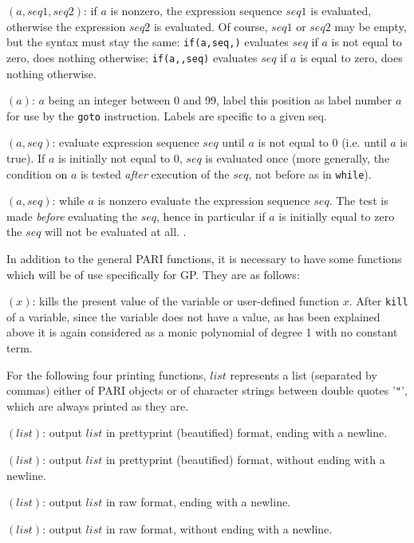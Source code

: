 $(a,seq1,seq2)$: if $a$ is nonzero, the expression sequence $seq1$
is evaluated, otherwise the expression $seq2$ is evaluated. Of course, $seq1$ or $seq2$
may be empty, but the syntax must stay the same: {\tt if(a,seq,)} evaluates $seq$ if
$a$ is not equal to zero, does nothing otherwise; {\tt if(a,,seq)} evaluates $seq$ if $a$
is equal to zero, does nothing otherwise.

$(a)$: $a$ being an integer between 0 and 99, label this
position as label number $a$ for use by the {\tt goto} instruction. Labels
are specific to a given seq.

$(a,seq)$: evaluate expression sequence $seq$ until $a$ is not
equal to 0 (i.e. until $a$ is true). If $a$ is initially not equal to 0, $seq$ is
evaluated once (more generally, the condition on $a$ is tested {\sl after} execution of
the $seq$, not before as in {\tt while}).

$(a,seq)$: while $a$ is nonzero evaluate the expression sequence
$seq$. The test is made {\sl before} evaluating the $seq$, hence in particular if $a$
is initially equal to zero the $seq$ will not be evaluated at all.
\smallskip
{}.

In addition to the general PARI functions, it is necessary to have some functions
which will be of use specifically for GP. They are as follows:

$(x)$: kills the present value of the variable or user-defined
function $x$. After {\tt kill} of a variable, since the variable does not have a value,
as has been explained above it is again considered as a monic polynomial of degree 1
with no constant term.

For the following four printing functions, $list$ represents a list (separated by
commas) either of PARI objects or of character strings between double quotes
'{\tt "}', which are always printed as they are.

$(list)$: output $list$ in prettyprint (beautified) format,
ending with a newline.

$(list)$: output $list$ in prettyprint (beautified) format,
without ending with a newline.

$(list)$: output $list$ in raw format, ending with a newline.

$(list)$: output $list$ in raw format, without ending with a 
newline.

